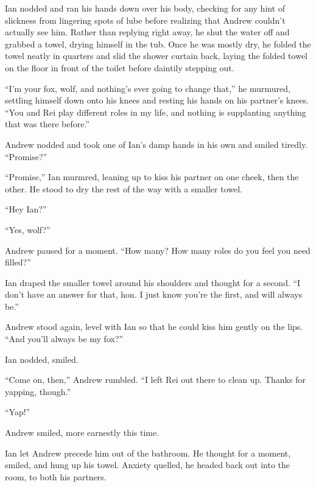Ian nodded and ran his hands down over his body, checking for any hint of slickness from lingering spots of lube before realizing that Andrew couldn't actually see him. Rather than replying right away, he shut the water off and grabbed a towel, drying himself in the tub. Once he was mostly dry, he folded the towel neatly in quarters and slid the shower curtain back, laying the folded towel on the floor in front of the toilet before daintily stepping out.

``I'm your fox, wolf, and nothing's ever going to change that,'' he murmured, settling himself down onto his knees and resting his hands on his partner's knees. ``You and Rei play different roles in my life, and nothing is supplanting anything that was there before.''

Andrew nodded and took one of Ian's damp hands in his own and smiled tiredly. ``Promise?''

``Promise,'' Ian murmred, leaning up to kiss his partner on one cheek, then the other. He stood to dry the rest of the way with a smaller towel.

``Hey Ian?''

``Yes, wolf?''

Andrew paused for a moment. ``How many? How many roles do you feel you need filled?''

Ian draped the smaller towel around his shoulders and thought for a second. ``I don't have an answer for that, hon. I just know you're the first, and will always be.''

Andrew stood again, level with Ian so that he could kiss him gently on the lips. ``And you'll always be my fox?''

Ian nodded, smiled.

``Come on, then,'' Andrew rumbled. ``I left Rei out there to clean up. Thanks for yapping, though.''

``Yap!''

Andrew smiled, more earnestly this time.

Ian let Andrew precede him out of the bathroom. He thought for a moment, smiled, and hung up his towel. Anxiety quelled, he headed back out into the room, to both his partners.
